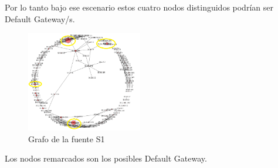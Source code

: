Por lo tanto bajo ese escenario estos cuatro nodos distinguidos podrían ser Default Gateway/s. 


\begin{figure}[H]
  \centering
    \includegraphics[width=0.45\textwidth]{grafo-red-labos-destacados.png}
  \caption{Grafo de la fuente S1}
  \label{grafo-s1}
\end{figure}

Los nodos remarcados son los posibles Default Gateway.

